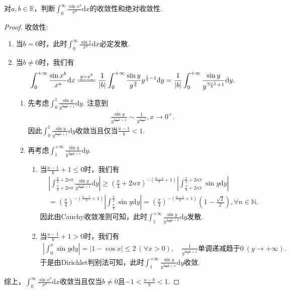 \documentclass[../../main.tex]{subfiles}%
\begin{document}
\begin{example}
对\(a,b\in\mathbb{R}\)，判断\(\int_{0}^{\infty}\frac{\sin x^b}{x^a}\mathrm{d}x\)的收敛性和绝对收敛性. 
\end{example}
\begin{proof}

{\heiti 收敛性:}
\begin{enumerate}
\item 当\(b = 0\)时，此时\(\int_{0}^{\infty}\frac{\sin 1}{x^a}\mathrm{d}x\)必定发散.
\item 当\(b\neq 0\)时，我们有
\begin{align}\label{100.52}
\int_{0}^{+\infty}\frac{\sin x^b}{x^a}\mathrm{d}x&\xlongequal{y = x^b}\frac{1}{|b|}\int_{0}^{+\infty}\frac{\sin y}{y^{\frac{a}{b}}}y^{\frac{1}{b}-1}\mathrm{d}y=\frac{1}{|b|}\int_{0}^{+\infty}\frac{\sin y}{y^{\frac{a - 1}{b}+1}}\mathrm{d}y.
\end{align}
\begin{enumerate}
\item 先考虑\(\int_{0}^{1}\frac{\sin y}{y^{\frac{a - 1}{b}+1}}\mathrm{d}y\). 注意到
\begin{align*}
\frac{\sin y}{y^{\frac{a - 1}{b}+1}}\sim\frac{1}{y^{\frac{a - 1}{b}}},x\rightarrow 0^+.
\end{align*}
因此\(\int_{0}^{1}\frac{\sin y}{y^{\frac{a - 1}{b}+1}}\mathrm{d}y\)收敛当且仅当\(\frac{a - 1}{b}<1\).
\item 再考虑\(\int_{1}^{+\infty}\frac{\sin y}{y^{\frac{a - 1}{b}+1}}\mathrm{d}y\).
\begin{enumerate}
\item 当\(\frac{a - 1}{b}+1\leqslant 0\)时，我们有
\begin{align*}
&\left|\int_{\frac{\pi}{4}+2n\pi}^{\frac{\pi}{2}+2n\pi}\frac{\sin y}{y^{\frac{a - 1}{b}+1}}\mathrm{d}y\right| \geqslant \left(\frac{\pi}{4}+2n\pi\right)^{-\left(\frac{a - 1}{b}+1\right)}\left|\int_{\frac{\pi}{4}+2n\pi}^{\frac{\pi}{2}+2n\pi}\sin y\mathrm{d}y\right|\\
&=\left(\frac{\pi}{4}\right)^{-\left(\frac{a - 1}{b}+1\right)}\left|\int_{\frac{\pi}{4}}^{\frac{\pi}{2}}\sin y\mathrm{d}y\right|=\left(\frac{\pi}{4}\right)^{-\left(\frac{a - 1}{b}+1\right)}\left(1 - \frac{\sqrt{2}}{2}\right),\forall n\in\mathbb{N}.
\end{align*}
因此由Cauchy收敛准则可知，此时\(\int_{1}^{+\infty}\frac{\sin y}{y^{\frac{a - 1}{b}+1}}\mathrm{d}y\)发散.
\item 当\(\frac{a - 1}{b}+1>0\)时，我们有
\begin{align*}
\left| \int_0^x{\sin y\mathrm{d}y} \right|=\left| 1-\cos x \right|\leqslant 2\ (\forall x > 0),\quad \frac{1}{y^{\frac{a - 1}{b}+1}}\text{单调递减趋于}0\ (y\rightarrow +\infty).
\end{align*}
于是由Dirichlet判别法可知，此时\(\int_{1}^{+\infty}\frac{\sin y}{y^{\frac{a - 1}{b}+1}}\mathrm{d}y\)收敛.
\end{enumerate}
\end{enumerate}
\end{enumerate}
综上，\(\int_{0}^{\infty}\frac{\sin x^b}{x^a}\mathrm{d}x\)收敛当且仅当\(b\neq 0\)且\(-1<\frac{a - b}{b}<1\).


\end{proof}
\end{document}
